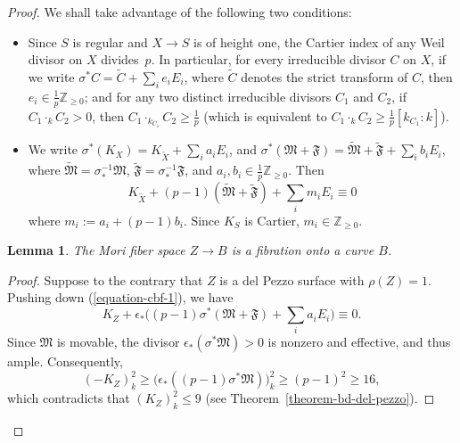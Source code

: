 \documentclass[reqno,oneside]{amsart}
\newtheorem{lemma}[theorem]{Lemma}
\theoremstyle{definition}
\theoremstyle{plain}
\numberwithin{equation}{section}
\begin{document}
\begin{proof}
  We shall take advantage of the following two conditions:
  \begin{itemize}
    \item[(a)] Since $S$ is regular and $X \to S$ is of height one, the Cartier index of any Weil divisor on $X$ divides~$p$.
      In particular, for every irreducible divisor $C$ on $X$, if we write $\sigma^*C = \widetilde{C} + \sum_i e_i E_i$, where $\widetilde{C}$ denotes the strict transform of $C$, then $e_i \in \frac1p \mathbb{Z}_{\geq 0}$; and for any two distinct irreducible divisors $C_1$ and $C_2$, if $C_1 \cdot_{k} C_2 >0$, then $C_1 \cdot_{k_{C_1}} C_2 \geq \frac1p$ (which is equivalent to $C_1 \cdot_{k} C_2 \geq \frac1p[k_{C_1}:k]$).
    \item[(b)] We write $\sigma^*(K_X) = K_{\widetilde{X}} + \sum_i a_i E_i$, 
      and $\sigma^* (\mathfrak{M} + \mathfrak{F}) = \widetilde{\mathfrak{M} } + \widetilde{\mathfrak{F}} + \sum_i b_i E_i$, where $\widetilde{\mathfrak{M} } = \sigma^{-1}_*\mathfrak{M}$, $\widetilde{\mathfrak{F} } = \sigma^{-1}_*\mathfrak{F}$, and $a_i, b_i\in \frac1p \mathbb{Z}_{\geq 0}$.
      Then
    \begin{equation}\label{equation-point-b}
      K_{\widetilde{X}} + (p-1) (\widetilde{\mathfrak{M} } + \widetilde{\mathfrak{F}}) + \sum_i m_i E_i \equiv 0
    \end{equation}
      where $m_i := a_i + (p-1)b_i$.
      Since $K_S$ is Cartier, $m_i \in \mathbb{Z}_{\geq 0}$.
\end{itemize}

\begin{lemma}\label{lemma-dim-base-one}
  The Mori fiber space $Z\to B$ is a fibration onto a curve $B$.
\end{lemma}
\begin{proof}
  Suppose to the contrary that $Z$ is a del Pezzo surface with $\rho(Z) = 1$.
  Pushing down (\ref{equation-cbf-1}), we have \[
    K_Z + \epsilon_*\bigl((p-1)\sigma^* (\mathfrak{M} + \mathfrak{F}) + \sum_i a_i E_i\bigr) \equiv 0.
  \]
  Since $\mathfrak{M}$ is movable, the divisor $\epsilon_*(\sigma^* \mathfrak{M}) >0$ is nonzero and effective, and thus ample.
  Consequently,
  $$(-K_Z)_k^2 \geq \bigl( \epsilon_*((p-1)\sigma^* \mathfrak{M}) \bigr)_k^2 \geq (p-1)^2 \geq 16,$$
  which contradicts that $(K_{Z})_k ^2 \le 9$ (see Theorem~\ref{theorem-bd-del-pezzo}).
\end{proof}


\end{proof}
\end{document}
